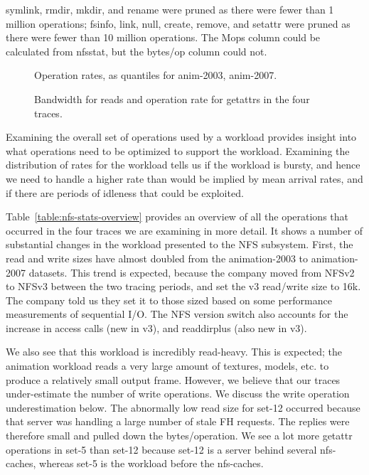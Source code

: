 \begin{table*}
\caption{symlink, rmdir, mkdir, and rename were pruned as there were
fewer than 1 million operations; fsinfo, link, null, create, remove,
and setattr were pruned as there were fewer than 10 million
operations.  The Mops column could be calculated from nfsstat, but the
bytes/op column could not.}

\label{table:nfs-stats-overview}
\end{table*}

\begin{figure*}
\caption{Operation rates, as quantiles for anim-2003, anim-2007.}
\label{fig:oprates}
\end{figure*}

\begin{figure*}
\caption{Bandwidth for reads and operation rate for getattrs in the four traces.}
\label{fig:bw-ops-quantiles}
\end{figure*}

Examining the overall set of operations used by a workload provides
insight into what operations need to be optimized to support the
workload.  Examining the distribution of rates for the workload tells
us if the workload is bursty, and hence we need to handle a higher
rate than would be implied by mean arrival rates, and if there are
periods of idleness that could be exploited.

Table~\ref{table:nfs-stats-overview} provides an overview of all the
operations that occurred in the four traces we are examining in more
detail.  It shows a number of substantial changes in the workload
presented to the NFS subsystem.  First, the read and write sizes have
almost doubled from the animation-2003 to animation-2007 datasets.  This trend is expected,
because the company moved from NFSv2 to NFSv3 between the two
tracing periods, and set the v3 read/write size to 16k.  The company told
us they set it to those sized based on some performance
measurements of sequential I/O.  The NFS version switch also accounts
for the increase in access calls (new in v3), and readdirplus (also
new in v3).  

We also see that this workload is incredibly read-heavy.  This is
expected; the animation workload reads a very large amount of
textures, models, etc. to produce a relatively small output frame.
However, we believe that our traces under-estimate the number of write
operations.  We discuss the write operation underestimation below.
The abnormally low read size for set-12 occurred because
that server was handling a large number of stale FH requests.  The
replies were therefore small and pulled down the bytes/operation.  We
see a lot more getattr operations in set-5 than set-12 because set-12
is a server behind several nfs-caches, whereas set-5 is the workload
before the nfs-caches.

